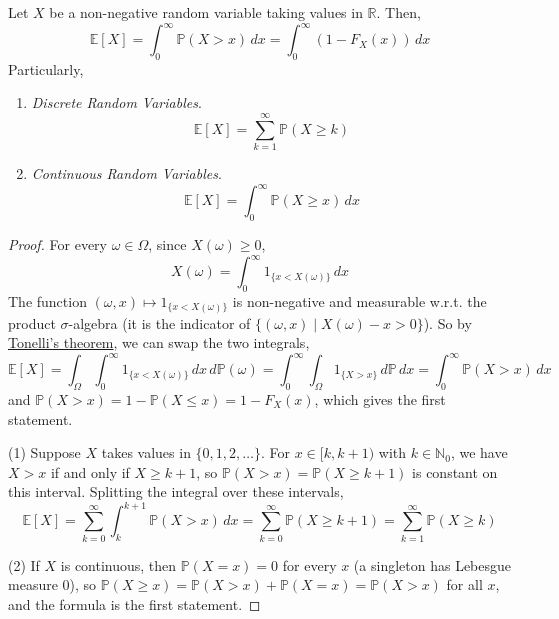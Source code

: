   \begin{theorem}
    \label{thm:tail-sum-formula}
		Let $X$ be a non-negative random variable taking values in $\mathbb{R}$. Then, 
		\begin{equation}
			\mathbb{E}[X] = \int_0^\infty \mathbb{P}(X > x) \,dx = \int_0^\infty (1 - F_X (x)) \,dx
		\end{equation}
		Particularly, 
		\begin{enumerate}
		  \item \textit{Discrete Random Variables}. 
				\begin{equation}
					\mathbb{E}[X] = \sum_{k=1}^\infty \mathbb{P}(X \geq k)
				\end{equation}

			\item \textit{Continuous Random Variables}. 
				\begin{equation}
					\mathbb{E}[X] = \int_0^\infty \mathbb{P}(X \geq x) \,dx 
				\end{equation}
		\end{enumerate}
  \end{theorem}
  \begin{proof}
    For every $\omega \in \Omega$, since $X(\omega) \geq 0$, 
    \begin{equation}
      X(\omega) = \int_0^\infty 1_{\{x < X(\omega)\}} \,dx
    \end{equation}
    The function $(\omega, x) \mapsto 1_{\{x < X(\omega)\}}$ is non-negative and measurable w.r.t. the product $\sigma$-algebra (it is the indicator of $\{(\omega, x) \mid X(\omega) - x > 0\}$). So by \hyperref[mt-thm:tonellis-theorem]{Tonelli's theorem}, we can swap the two integrals, 
    \begin{equation}
      \mathbb{E}[X] = \int_\Omega \int_0^\infty 1_{\{x < X(\omega)\}} \,dx \,d\mathbb{P}(\omega) = \int_0^\infty \int_\Omega 1_{\{X > x\}} \,d\mathbb{P} \,dx = \int_0^\infty \mathbb{P}(X > x) \,dx
    \end{equation}
    and $\mathbb{P}(X > x) = 1 - \mathbb{P}(X \leq x) = 1 - F_X (x)$, which gives the first statement. 

    (1) Suppose $X$ takes values in $\{0, 1, 2, \ldots\}$. For $x \in [k, k+1)$ with $k \in \mathbb{N}_0$, we have $X > x$ if and only if $X \geq k + 1$, so $\mathbb{P}(X > x) = \mathbb{P}(X \geq k+1)$ is constant on this interval. Splitting the integral over these intervals, 
    \begin{equation}
      \mathbb{E}[X] = \sum_{k=0}^\infty \int_k^{k+1} \mathbb{P}(X > x) \,dx = \sum_{k=0}^\infty \mathbb{P}(X \geq k+1) = \sum_{k=1}^\infty \mathbb{P}(X \geq k)
    \end{equation}

    (2) If $X$ is continuous, then $\mathbb{P}(X = x) = 0$ for every $x$ (a singleton has Lebesgue measure $0$), so $\mathbb{P}(X \geq x) = \mathbb{P}(X > x) + \mathbb{P}(X = x) = \mathbb{P}(X > x)$ for all $x$, and the formula is the first statement. 
  \end{proof}

